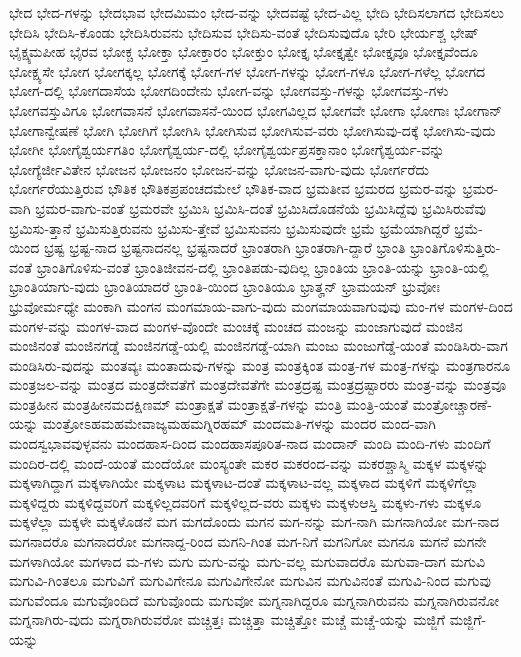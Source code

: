 {ಭೇದ
ಭೇದ-ಗಳನ್ನು
ಭೇದಭಾವ
ಭೇದಮಿಮಂ
ಭೇದ-ವನ್ನು
ಭೇದವಷ್ಟೆ
ಭೇದ-ವಿಲ್ಲ
ಭೇದಿ
ಭೇದಿಸಲಾಗದ
ಭೇದಿಸಲು
ಭೇದಿಸಿ
ಭೇದಿಸಿ-ಕೊಂಡು
ಭೇದಿಸಿರುವನು
ಭೇದಿಸುವ
ಭೇದಿಸು-ವಂತೆ
ಭೇದಿಸುವುದೊ
ಭೇರಿ
ಭೇರ್ಯಶ್ಚ
ಭೇಷ್
ಭೈಕ್ಷ್ಯಮಪೀಹ
ಭೈರವ
ಭೋಕ್ಚ
ಭೋಕ್ತಾ
ಭೋಕ್ತಾರಂ
ಭೋಕ್ತುಂ
ಭೋಕ್ತೃ
ಭೋಕ್ತೃತ್ವೇ
ಭೋಕ್ತೃವೂ
ಭೋಕ್ತೃವೆಂದೂ
ಭೋಕ್ಷ್ಯಸೇ
ಭೋಗ
ಭೋಗಕ್ಕಲ್ಲ
ಭೋಗಕ್ಕೆ
ಭೋಗ-ಗಳ
ಭೋಗ-ಗಳನ್ನು
ಭೋಗ-ಗಳೂ
ಭೋಗ-ಗಳೆಲ್ಲ
ಭೋಗದ
ಭೋಗ-ದಲ್ಲಿ
ಭೋಗದಾಸೆಯ
ಭೋಗದಿಂದೇನು
ಭೋಗ-ವನ್ನು
ಭೋಗವಸ್ತು-ಗಳನ್ನು
ಭೋಗವಸ್ತು-ಗಳು
ಭೋಗವಸ್ತುವಿಗೂ
ಭೋಗವಾಸನೆ
ಭೋಗವಾಸನೆ-ಯಿಂದ
ಭೋಗವಿಲ್ಲದ
ಭೋಗವೇ
ಭೋಗಾ
ಭೋಗಾಃ
ಭೋಗಾನ್
ಭೋಗಾನ್ವೇಷಣೆ
ಭೋಗಿ
ಭೋಗಿಗೆ
ಭೋಗಿಸಿ
ಭೋಗಿಸುವ
ಭೋಗಿಸುವ-ವರು
ಭೋಗಿಸುವು-ದಕ್ಕೆ
ಭೋಗಿಸು-ವುದು
ಭೋಗೀ
ಭೋಗೈಶ್ವರ್ಯಗತಿಂ
ಭೋಗೈಶ್ವರ್ಯ-ದಲ್ಲಿ
ಭೋಗೈಶ್ವರ್ಯಪ್ರಸಕ್ತಾನಾಂ
ಭೋಗೈಶ್ವರ್ಯ-ವನ್ನು
ಭೋಗ್ಯೆರ್ಜೀವಿತೇನ
ಭೋಜನ
ಭೋಜನಂ
ಭೋಜನ-ವನ್ನು
ಭೋಜನ-ವಾಗು-ವುದು
ಭೋರ್ಗರೆದು
ಭೋರ್ಗರೆಯುತ್ತಿರುವ
ಭೌತಿಕ
ಭೌತಿಕಪ್ರಪಂಚದಮೇಲೆ
ಭೌತಿಕ-ವಾದ
ಭ್ರಮತೀವ
ಭ್ರಮರದ
ಭ್ರಮರ-ವನ್ನು
ಭ್ರಮರ-ವಾಗಿ
ಭ್ರಮರ-ವಾಗು-ವಂತೆ
ಭ್ರಮರವೇ
ಭ್ರಮಿಸಿ
ಭ್ರಮಿಸಿ-ದಂತೆ
ಭ್ರಮಿಸಿದೊಡನೆಯೆ
ಭ್ರಮಿಸಿದ್ದೆವು
ಭ್ರಮಿಸಿರುವೆವು
ಭ್ರಮಿಸು-ತ್ತಾನೆ
ಭ್ರಮಿಸುತ್ತಿರುವನು
ಭ್ರಮಿಸು-ತ್ತೇವೆ
ಭ್ರಮಿಸುವನು
ಭ್ರಮಿಸುವುದೇ
ಭ್ರಮೆ
ಭ್ರಮೆಯಾಗಿದ್ದರೆ
ಭ್ರಮೆ-ಯಿಂದ
ಭ್ರಷ್ಟ
ಭ್ರಷ್ಟ-ನಾದ
ಭ್ರಷ್ಟನಾದನಲ್ಲ
ಭ್ರಷ್ಟನಾದರೆ
ಭ್ರಾಂತರಾಗಿ
ಭ್ರಾಂತರಾಗಿ-ದ್ದಾರೆ
ಭ್ರಾಂತಿ
ಭ್ರಾಂತಿಗೊಳಿಸುತ್ತಿರು-ವಂತೆ
ಭ್ರಾಂತಿಗೊಳಿಸು-ವಂತೆ
ಭ್ರಾಂತಿಜೀವನ-ದಲ್ಲಿ
ಭ್ರಾಂತಿಪಡು-ವುದಿಲ್ಲ
ಭ್ರಾಂತಿಯ
ಭ್ರಾಂತಿ-ಯನ್ನು
ಭ್ರಾಂತಿ-ಯಲ್ಲಿ
ಭ್ರಾಂತಿಯಾಗು-ವುದು
ಭ್ರಾಂತಿಯಾದರೆ
ಭ್ರಾಂತಿ-ಯಿಂದ
ಭ್ರಾಂತಿಯೂ
ಭ್ರಾತೄನ್
ಭ್ರಾಮಯನ್
ಭ್ರುವೋಃ
ಭ್ರುವೋರ್ಮಧ್ಯೇ
ಮಂಕಾಗಿ
ಮಂಗನ
ಮಂಗಮಾಯ-ವಾಗು-ವುದು
ಮಂಗಮಾಯವಾಗುವುವು
ಮಂ-ಗಳ
ಮಂಗಳ-ದಿಂದ
ಮಂಗಳ-ವನ್ನು
ಮಂಗಳ-ವಾದ
ಮಂಗಳ-ವೊಂದೇ
ಮಂಚಕ್ಕೆ
ಮಂಚದ
ಮಂಜನ್ನು
ಮಂಜಾಗುವುದೆ
ಮಂಜಿನ
ಮಂಜಿನಂತೆ
ಮಂಜಿನಗಡ್ಡೆ
ಮಂಜಿನಗಡ್ಡೆ-ಯಲ್ಲಿ
ಮಂಜಿನಗಡ್ಡೆ-ಯಾಗಿ
ಮಂಜು
ಮಂಜುಗೆಡ್ಡೆ-ಯಂತೆ
ಮಂಡಿಸಿರು-ವಾಗ
ಮಂಡಿಸಿರು-ವುದನ್ನು
ಮಂತವ್ಯಃ
ಮಂತಾದುವು-ಗಳನ್ನು
ಮಂತ್ರ
ಮಂತ್ರಕ್ಕಿಂತ
ಮಂತ್ರ-ಗಳ
ಮಂತ್ರ-ಗಳನ್ನು
ಮಂತ್ರಗಾರನೂ
ಮಂತ್ರಜಲ-ವನ್ನು
ಮಂತ್ರದ
ಮಂತ್ರದೇವತೆಗೆ
ಮಂತ್ರದೇವತೆಗೇ
ಮಂತ್ರದ್ರಷ್ಟ
ಮಂತ್ರದ್ರಷ್ಟಾರರು
ಮಂತ್ರ-ವನ್ನು
ಮಂತ್ರವೂ
ಮಂತ್ರಹೀನ
ಮಂತ್ರಹೀನಮದಕ್ಷಿಣಮ್
ಮಂತ್ರಾಕ್ಷತೆ
ಮಂತ್ರಾಕ್ಷತೆ-ಗಳನ್ನು
ಮಂತ್ರಿ
ಮಂತ್ರಿ-ಯಂತೆ
ಮಂತ್ರೋಚ್ಚಾರಣೆ-ಯನ್ನು
ಮಂತ್ರೋಽಹಮಹಮೇವಾಜ್ಯಮಹಮಗ್ನಿರಹಮ್
ಮಂದಮತಿ-ಗಳನ್ನು
ಮಂದರ
ಮಂದ-ವಾಗಿ
ಮಂದಸ್ವಭಾವವುಳ್ಳವನು
ಮಂದಹಾಸ-ದಿಂದ
ಮಂದಹಾಸಪೂರಿತ-ನಾದ
ಮಂದಾನ್
ಮಂದಿ
ಮಂದಿ-ಗಳು
ಮಂದಿಗೆ
ಮಂದಿರ-ದಲ್ಲಿ
ಮಂದೆ-ಯಂತೆ
ಮಂದೆಯೋ
ಮಂಸ್ಯಂತೇ
ಮಕರ
ಮಕರಂದ-ವನ್ನು
ಮಕರಶ್ಚಾಸ್ಮಿ
ಮಕ್ಕಳ
ಮಕ್ಕಳನ್ನು
ಮಕ್ಕಳಾಗಿದ್ದಾಗ
ಮಕ್ಕಳಾಗಿಯೇ
ಮಕ್ಕಳಾಟ
ಮಕ್ಕಳಾಟ-ದಂತೆ
ಮಕ್ಕಳಾಟ-ವಲ್ಲ
ಮಕ್ಕಳಾದ
ಮಕ್ಕಳಿಗೆ
ಮಕ್ಕಳಿಗೆಲ್ಲಾ
ಮಕ್ಕಳಿದ್ದರು
ಮಕ್ಕಳಿದ್ದವರಿಗೆ
ಮಕ್ಕಳಿಲ್ಲದವರಿಗೆ
ಮಕ್ಕಳಿಲ್ಲದ-ವರು
ಮಕ್ಕಳು
ಮಕ್ಕಳುಆಸ್ತಿ
ಮಕ್ಕಳು-ಗಳು
ಮಕ್ಕಳೂ
ಮಕ್ಕಳೆಲ್ಲಾ
ಮಕ್ಕಳೇ
ಮಕ್ಕಳೊಡನೆ
ಮಗ
ಮಗದೊಂದು
ಮಗನ
ಮಗ-ನನ್ನು
ಮಗ-ನಾಗಿ
ಮಗನಾಗಿಯೋ
ಮಗ-ನಾದ
ಮಗನಾದರೊ
ಮಗನಾದರೋ
ಮಗನಾದ್ದ-ರಿಂದ
ಮಗನಿ-ಗಿಂತ
ಮಗ-ನಿಗೆ
ಮಗನಿಗೋ
ಮಗನೂ
ಮಗನೆ
ಮಗನೇ
ಮಗಳಾಗಿಯೋ
ಮಗಳಾದ
ಮ-ಗಳು
ಮಗು
ಮಗು-ವನ್ನು
ಮಗು-ವಲ್ಲ
ಮಗುವಾದರೊ
ಮಗುವಾ-ದಾಗ
ಮಗುವಿ
ಮಗುವಿ-ಗಿಂತಲೂ
ಮಗುವಿಗೆ
ಮಗುವಿಗೇನೂ
ಮಗುವಿಗೇನೋ
ಮಗುವಿನ
ಮಗುವಿನಂತೆ
ಮಗುವಿ-ನಿಂದ
ಮಗುವು
ಮಗುವೆಂದೂ
ಮಗುವೊಂದಿದೆ
ಮಗುವೊಂದು
ಮಗುವೋ
ಮಗ್ನನಾಗಿದ್ದರೂ
ಮಗ್ನನಾಗಿರುವನು
ಮಗ್ನನಾಗಿರುವನೋ
ಮಗ್ನನಾಗಿರು-ವುದು
ಮಗ್ನರಾಗಿರುವರೋ
ಮಚ್ಚಿತ್ತಃ
ಮಚ್ಚಿತ್ತಾ
ಮಚ್ಚಿತ್ತೋ
ಮಚ್ಚೆ
ಮಚ್ಚೆ-ಯನ್ನು
ಮಜ್ಜಿಗೆ
ಮಜ್ಜಿಗೆ-ಯನ್ನು
}
